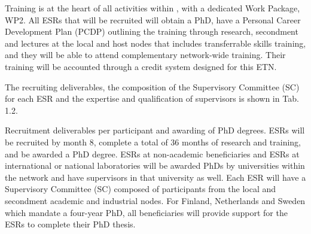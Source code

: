 Training is at the heart of all activities within \acronym, with a dedicated Work Package, WP2. All ESRs that will be recruited will obtain a PhD, have a Personal Career Development Plan (PCDP) outlining the training through research, secondment and lectures at the local and host nodes that includes transferrable skills training, and they will be able to attend complementary network-wide training. Their training will be accounted through a credit system designed for this ETN. 

The recruiting deliverables, the composition of the Supervisory Committee (SC) for each ESR and the expertise and qualification of supervisors is shown in Tab. 1.2.



\noindent \color{blue}Recruitment deliverables per participant and awarding of PhD degrees. \color{black}
ESRs will be recruited by month 8, complete a total of 36 months of research and training, and be awarded a PhD degree. 
ESRs at non-academic beneficiaries and ESRs at international or national laboratories will be awarded PhDs by universities within the network and have supervisors in that university as well. 
Each ESR will have a Supervisory Committee (SC) composed of participants from the local and secondment academic and industrial nodes. 
For Finland, Netherlands and Sweden which mandate a four-year PhD, all beneficiaries will provide support for the ESRs to complete their PhD thesis.

